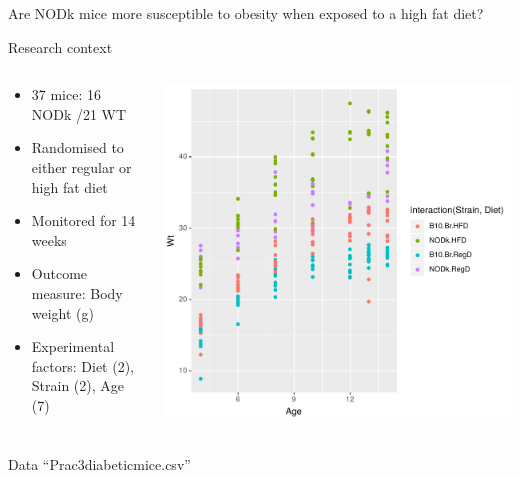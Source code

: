 \documentclass{beamer}
\begin{document}
\begin{frame}{Are NODk mice more susceptible to obesity when exposed to a high fat diet?}
  
  \begin{block}{Research context}
 \begin{columns}
  \begin{column}{0.5\textwidth}
   \begin{itemize}
    \item 37 mice: 16 NODk /21 WT
    \item Randomised to either regular or high fat diet
    \item Monitored for 14 weeks
    \item Outcome measure: Body weight (g)
    \item Experimental factors: Diet (2), Strain (2), Age (7)
   \end{itemize}
  \end{column}
  \begin{column}{0.5\textwidth}
    \includegraphics[width=\textwidth]{Figures/micedata}
  \end{column}

 \end{columns}
 \end{block}
 
 Data ``Prac3diabeticmice.csv''
 
\end{frame}
\end{document}
